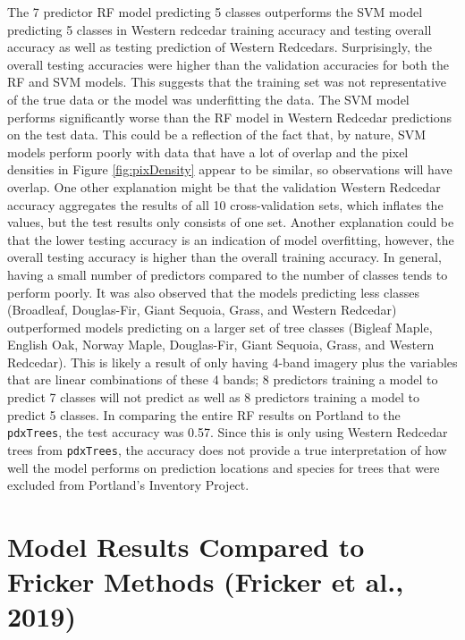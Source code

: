 \documentclass[12pt,twoside]{reedthesis}
\begin{document}
The 7 predictor RF model predicting 5 classes outperforms the SVM model predicting 5 classes in Western redcedar training accuracy and testing overall accuracy as well as testing prediction of Western Redcedars. Surprisingly, the overall testing accuracies were higher than the validation accuracies for both the RF and SVM models. This suggests that the training set was not representative of the true data or the model was underfitting the data. The SVM model performs significantly worse than the RF model in Western Redcedar predictions on the test data. This could be a reflection of the fact that, by nature, SVM models perform poorly with data that have a lot of overlap and the pixel densities in Figure \ref{fig:pixDensity} appear to be similar, so observations will have overlap. One other explanation might be that the validation Western Redcedar accuracy aggregates the results of all 10 cross-validation sets, which inflates the values, but the test results only consists of one set. Another explanation could be that the lower testing accuracy is an indication of model overfitting, however, the overall testing accuracy is higher than the overall training accuracy. In general, having a small number of predictors compared to the number of classes tends to perform poorly. It was also observed that the models predicting less classes (Broadleaf, Douglas-Fir, Giant Sequoia, Grass, and Western Redcedar) outperformed models predicting on a larger set of tree classes (Bigleaf Maple, English Oak, Norway Maple, Douglas-Fir, Giant Sequoia, Grass, and Western Redcedar). This is likely a result of only having 4-band imagery plus the variables that are linear combinations of these 4 bands; 8 predictors training a model to predict 7 classes will not predict as well as 8 predictors training a model to predict 5 classes. In comparing the entire RF results on Portland to the \texttt{pdxTrees}, the test accuracy was 0.57. Since this is only using Western Redcedar trees from \texttt{pdxTrees}, the accuracy does not provide a true interpretation of how well the model performs on prediction locations and species for trees that were excluded from Portland's Inventory Project.

\hypertarget{model-results-compared-to-fricker-methods-fricker_convolutional_2019}{%
\section{Model Results Compared to Fricker Methods (Fricker et al., 2019)}\label{model-results-compared-to-fricker-methods-fricker_convolutional_2019}}
\end{document}

